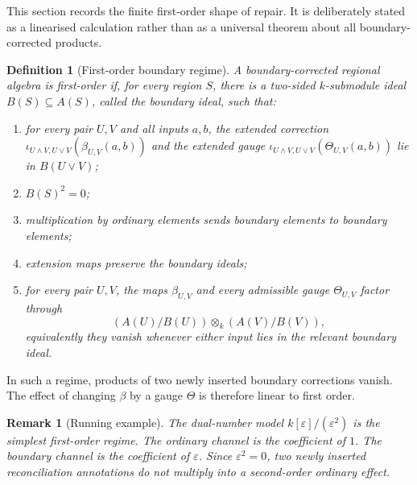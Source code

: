 \documentclass[11pt]{article}
\newtheorem{definition}[theorem]{Definition}
\newtheorem{remark}[theorem]{Remark}
\begin{document}
This section records the finite first-order shape of repair. It is deliberately stated as a linearised calculation rather than as a universal theorem about all boundary-corrected products.

\begin{definition}[First-order boundary regime]
A boundary-corrected regional algebra is first-order if, for every region \(S\), there is a two-sided \(k\)-submodule ideal \(B(S)\subseteq A(S)\), called the boundary ideal, such that:

\begin{enumerate}[label=(\roman*)]
\item for every pair \(U,V\) and all inputs \(a,b\), the extended correction \(\iota_{U\wedge V,U\vee V}(\beta_{U,V}(a,b))\) and the extended gauge \(\iota_{U\wedge V,U\vee V}(\Theta_{U,V}(a,b))\) lie in \(B(U\vee V)\);
\item \(B(S)^2=0\);
\item multiplication by ordinary elements sends boundary elements to boundary elements;
\item extension maps preserve the boundary ideals;
\item for every pair \(U,V\), the maps \(\beta_{U,V}\) and every admissible gauge \(\Theta_{U,V}\) factor through
\[
(A(U)/B(U))\otimes_k(A(V)/B(V)),
\]
equivalently they vanish whenever either input lies in the relevant boundary ideal.
\end{enumerate}
\end{definition}

In such a regime, products of two newly inserted boundary corrections vanish. The effect of changing \(\beta\) by a gauge \(\Theta\) is therefore linear to first order.

\begin{remark}[Running example]
The dual-number model \(k[\varepsilon]/(\varepsilon^2)\) is the simplest first-order regime. The ordinary channel is the coefficient of \(1\). The boundary channel is the coefficient of \(\varepsilon\). Since \(\varepsilon^2=0\), two newly inserted reconciliation annotations do not multiply into a second-order ordinary effect.
\end{remark}
\end{document}
